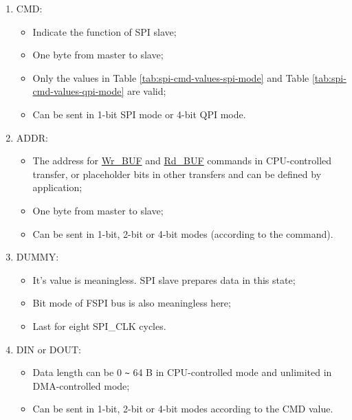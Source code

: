 \documentclass[main\_\_EN.tex]{subfiles}
\begin{document}
\begin{enumerate}
   \item CMD:
        \begin{itemize}
            \item Indicate the function of SPI slave;
            \item One byte from master to slave;
            \item Only the values in Table \ref{tab:spi-cmd-values-spi-mode} and Table \ref{tab:spi-cmd-values-qpi-mode} are valid;
            \item Can be sent in 1-bit SPI mode or 4-bit QPI mode.
        \end{itemize}

   \item ADDR:
        \begin{itemize}
            \item The address for \hyperlink{other:spi-item-wrbuf}{Wr\_BUF} and \hyperlink{other:spi-item-rdbuf}{Rd\_BUF} commands in CPU-controlled transfer, or placeholder bits in other transfers and can be defined by application;
            \item One byte from master to slave;
            \item Can be sent in 1-bit, 2-bit or 4-bit modes (according to the command).
        \end{itemize}

   \item DUMMY:
        \begin{itemize}
            \item It's value is meaningless. SPI slave prepares data in this state;
            \item Bit mode of FSPI bus is also meaningless here;
            \item Last for eight SPI\_CLK cycles.
        \end{itemize}

   \item DIN or DOUT:

        \begin{itemize}
            \item Data length can be 0 \verb+~+ 64 B in CPU-controlled mode and unlimited in DMA-controlled mode;
            \item Can be sent in 1-bit, 2-bit or 4-bit modes according to the CMD value.
        \end{itemize}

   \end{enumerate}
\end{document}
